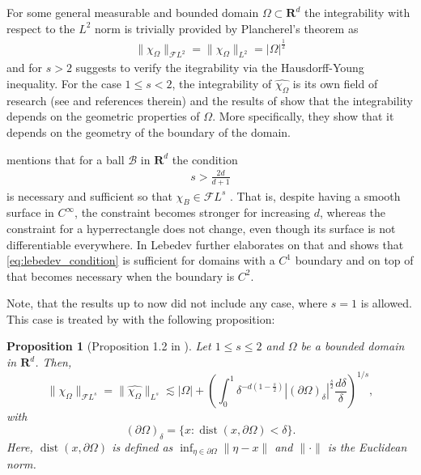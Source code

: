 \documentclass[a4paper]{article}
\newcommand{\rr}[1]{\mathbf{R}^{#1}}
\newcommand{\norm}[2]{\|#1\|_{#2}}
\newcommand{\F}[0]{\mathscr{F}}
\newcommand{\FL}[1]{\F L^{#1}}
\newcommand{\chF}[1]{\chi_{#1}}
\numberwithin{equation}{section}
\newtheorem{proposition}[theorem]{Proposition}
\theoremstyle{remark}
\begin{document}
For some general measurable and bounded domain $\Omega\subset\rr{d}$ the integrability with respect to the $L^2$ norm is trivially provided by Plancherel's theorem as
\begin{align*}
    \norm{\chF{\Omega}}{\FL{2}}=\norm{\chF{\Omega}}{L^2}=|\Omega|^{\frac{1}{2}}
\end{align*}
and for $s>2$ \cite{Ko16FourierTransformRegularity} suggests to verify the itegrability via the Hausdorff-Young inequality.
For the case $1\leq s<2$, the integrability of $\widehat{\chF{\Omega}}$ is its own field of research (see \cite{Lebedev13FourierTransformCharacteristic,Ko16FourierTransformRegularity} and references therein)
and the results of \cite{Lebedev13FourierTransformCharacteristic,Ko16FourierTransformRegularity} show that the integrability depends on the geometric properties of $\Omega$.
More specifically, they show that it depends on the geometry of the boundary of the domain.

\citeauthor{Lebedev13FourierTransformCharacteristic} mentions that for a ball $\mathcal{B}$ in $\rr{d}$ the condition 
\begin{align}
\label{eq:lebedev_condition}
    s>\frac{2d}{d+1}
\end{align}
is necessary and sufficient so that $\chF{B}\in\FL{s}$  \cite{Lebedev13FourierTransformCharacteristic}.
That is, despite having a smooth surface in
$C^\infty$,
the constraint becomes stronger for increasing $d$,
whereas the constraint for a hyperrectangle does not change, 
even though its surface is not differentiable everywhere.
In
\cite{Lebedev13FourierTransformCharacteristic}
Lebedev further elaborates on that and shows that \cref{eq:lebedev_condition} is sufficient for domains with a $C^1$ boundary and on top of that becomes necessary when the boundary is $C^2$.

Note, that the results up to now did not include any case, where $s=1$ is allowed.
This case is treated by \cite{Ko16FourierTransformRegularity} with the following proposition:

\begin{proposition}[Proposition 1.2 in \cite{Ko16FourierTransformRegularity}]
\label{prop:Fourier_Char_low_p_bound}
    Let $1 \leq s \leq 2$ and $\Omega$ be a bounded domain
    in $\rr{d}$.
    Then,
    $$
        \norm{\chF{\Omega}}{\FL{s}}=\norm{\widehat{\chF{\Omega}}}{L^s} \lesssim|\Omega|+\left(\int_0^1 \delta^{-d\left(1-\frac{s}{2}\right)}\left|(\partial \Omega)_\delta\right|^{\frac{s}{2}} \frac{d \delta}{\delta}\right)^{1 / s},
    $$
    with
    \begin{equation}\label{eq:boundaryE_dist}
        (\partial \Omega)_\delta=\{x: \operatorname{dist}(x, \partial \Omega)<\delta\}.
    \end{equation}
    Here, $\operatorname{dist}(x, \partial \Omega)$
    is defined as 
    $\inf _{\eta\in \partial \Omega} \|\eta-x\|$
    and $\|\cdot \|$ is the Euclidean norm.
\end{proposition}
\end{document}
